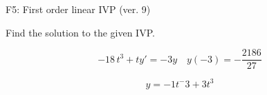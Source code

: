 \begin{exercise}
  \begin{exerciseTitle}F5: First order linear IVP (ver. 9)\end{exerciseTitle}
  \begin{exerciseStatement}
    
Find the solution to the given IVP.

    
\[-18 \, t^{3} +ty'= -3 y \hspace{1em} y( -3 ) = -\frac{2186}{27}\]

  \end{exerciseStatement}
  \begin{exerciseAnswer}
    
\[y= -1 t^ -3 +3 t^{3}\]

  \end{exerciseAnswer}
\end{exercise}